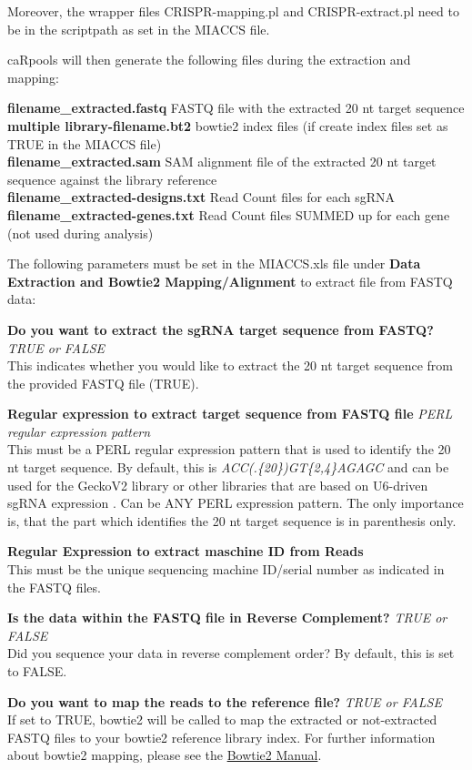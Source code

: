\documentclass[]{article}
\begin{document}
Moreover, the wrapper files CRISPR-mapping.pl and CRISPR-extract.pl need
to be in the scriptpath as set in the MIACCS file.

caRpools will then generate the following files during the extraction
and mapping:

\textbf{filename\_extracted.fastq} FASTQ file with the extracted 20 nt
target sequence\\
\textbf{multiple library-filename.bt2} bowtie2 index files (if create
index files set as TRUE in the MIACCS file)\\
\textbf{filename\_extracted.sam} SAM alignment file of the extracted 20
nt target sequence against the library reference\\
\textbf{filename\_extracted-designs.txt} Read Count files for each
sgRNA\\
\textbf{filename\_extracted-genes.txt} Read Count files SUMMED up for
each gene (not used during analysis)

The following parameters must be set in the MIACCS.xls file under
\textbf{Data Extraction and Bowtie2 Mapping/Alignment} to extract file
from FASTQ data:

\textbf{Do you want to extract the sgRNA target sequence from FASTQ?}
\emph{TRUE or FALSE}\\
This indicates whether you would like to extract the 20 nt target
sequence from the provided FASTQ file (TRUE).

\textbf{Regular expression to extract target sequence from FASTQ file}
\emph{PERL regular expression pattern}\\
This must be a PERL regular expression pattern that is used to identify
the 20 nt target sequence. By default, this is
\emph{ACC(.\{20\})GT\{2,4\}AGAGC} and can be used for the GeckoV2
library or other libraries that are based on U6-driven sgRNA expression
. Can be ANY PERL expression pattern. The only importance is, that the
part which identifies the 20 nt target sequence is in parenthesis only.

\textbf{Regular Expression to extract maschine ID from Reads}\\
This must be the unique sequencing machine ID/serial number as indicated
in the FASTQ files.

\textbf{Is the data within the FASTQ file in Reverse Complement?}
\emph{TRUE or FALSE}\\
Did you sequence your data in reverse complement order? By default, this
is set to FALSE.

\textbf{Do you want to map the reads to the reference file?} \emph{TRUE
or FALSE}\\
If set to TRUE, bowtie2 will be called to map the extracted or
not-extracted FASTQ files to your bowtie2 reference library index. For
further information about bowtie2 mapping, please see the
\href{http://bowtie-bio.sourceforge.net/bowtie2/manual.shtml}{Bowtie2
Manual}.
\end{document}
